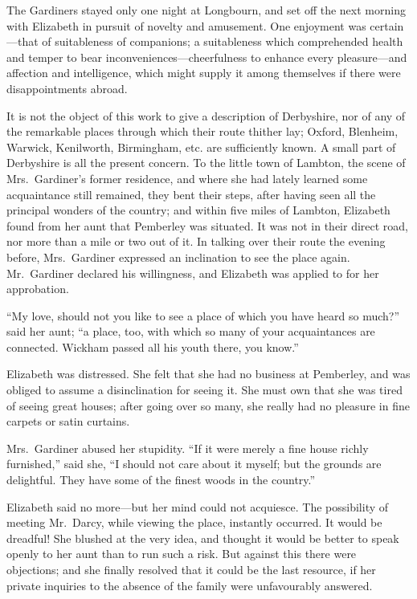 The Gardiners stayed only one night at Longbourn, and set off
the next morning with Elizabeth in pursuit of novelty and
amusement.  One enjoyment was certain---that of suitableness
of companions; a suitableness which comprehended health and
temper to bear inconveniences---cheerfulness to enhance every
pleasure---and affection and intelligence, which might supply
it among themselves if there were disappointments abroad.

It is not the object of this work to give a description of
Derbyshire, nor of any of the remarkable places through which
their route thither lay; Oxford, Blenheim, Warwick, Kenilworth,
Birmingham, etc. are sufficiently known.  A small part of
Derbyshire is all the present concern.  To the little town of
Lambton, the scene of Mrs.\ Gardiner's former residence, and
where she had lately learned some acquaintance still remained,
they bent their steps, after having seen all the principal wonders
of the country; and within five miles of Lambton, Elizabeth
found from her aunt that Pemberley was situated.  It was not in
their direct road, nor more than a mile or two out of it.  In
talking over their route the evening before, Mrs.\ Gardiner
expressed an inclination to see the place again.  Mr.\ Gardiner
declared his willingness, and Elizabeth was applied to for her
approbation.

``My love, should not you like to see a place of which you have
heard so much?'' said her aunt; ``a place, too, with which so
many of your acquaintances are connected.  Wickham passed all
his youth there, you know.''

Elizabeth was distressed.  She felt that she had no business at
Pemberley, and was obliged to assume a disinclination for seeing
it.  She must own that she was tired of seeing great houses; after
going over so many, she really had no pleasure in fine carpets or
satin curtains.

Mrs.\ Gardiner abused her stupidity.  ``If it were merely a fine
house richly furnished,'' said she, ``I should not care about it
myself; but the grounds are delightful.  They have some of the
finest woods in the country.''

Elizabeth said no more---but her mind could not acquiesce.
The possibility of meeting Mr.\ Darcy, while viewing the place,
instantly occurred.  It would be dreadful!  She blushed at the
very idea, and thought it would be better to speak openly to
her aunt than to run such a risk.  But against this there were
objections; and she finally resolved that it could be the last
resource, if her private inquiries to the absence of the family
were unfavourably answered.

